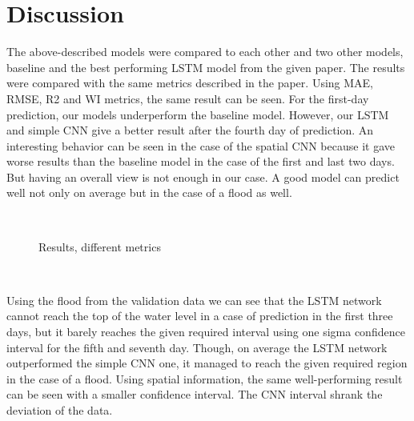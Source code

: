 \documentclass{article}
\begin{document}
\section{Discussion}

The above-described models were compared to each other and two other models,
baseline and the best performing LSTM model from the given
paper{\cite{WaterLevel2023}}. The results were compared with the same metrics
described in the paper. Using MAE, RMSE, R2 and WI metrics, the same result
can be seen. For the first-day prediction, our models underperform the
baseline model. However, our LSTM and simple CNN give a better result after
the fourth day of prediction. An interesting behavior can be seen in the case
of the spatial CNN because it gave worse results than the baseline model in
the case of the first and last two days. But having an overall view is not
enough in our case. A good model can predict well not only on average but in
the case of a flood as well.

\

\begin{figure}[h]
  \caption{Results, different metrics}
\end{figure}

\

Using the flood from the validation data we can see that the LSTM network
cannot reach the top of the water level in a case of prediction in the first
three days, but it barely reaches the given required interval using one sigma
confidence interval for the fifth and seventh day. Though, on average the LSTM
network outperformed the simple CNN one, it managed to reach the given
required region in the case of a flood. Using spatial information, the same
well-performing result can be seen with a smaller confidence interval. The CNN
interval shrank the deviation of the data.
\end{document}
